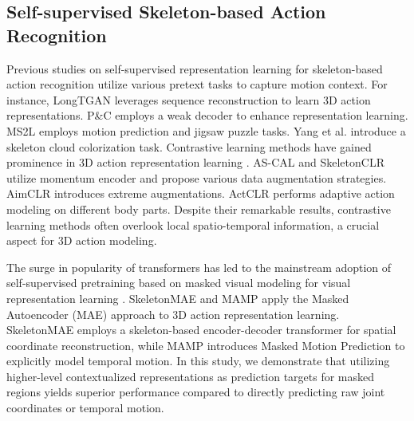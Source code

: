 \subsection{Self-supervised Skeleton-based Action Recognition}
Previous studies \cite{zheng2018unsupervised,su2020predict,lin2020ms2l} on
self-supervised representation learning for skeleton-based action recognition
utilize various pretext tasks to capture motion context.
For instance, LongTGAN \cite{zheng2018unsupervised} leverages sequence reconstruction
to learn 3D action representations. P\&C \cite{su2020predict} employs a weak
decoder to enhance representation learning. MS2L \cite{lin2020ms2l} employs
motion prediction and jigsaw puzzle tasks. Yang et al. \cite{yang2021skeleton}
introduce a skeleton cloud colorization task.
Contrastive learning methods have gained prominence in 3D action representation learning
\cite{he2020momentum,grill2020bootstrap,rao2021augmented,guo2022contrastive,moliner2022bootstrapped,lin2023actionlet}.
AS-CAL \cite{rao2021augmented} and SkeletonCLR \cite{li20213d} utilize momentum encoder
and propose various data augmentation strategies. AimCLR \cite{guo2022contrastive} introduces
extreme augmentations. ActCLR \cite{lin2023actionlet} performs adaptive action modeling
on different body parts. Despite their remarkable results, contrastive learning methods
often overlook local spatio-temporal information, a crucial aspect for 3D action modeling.

The surge in popularity of transformers has led to the mainstream adoption of self-supervised
pretraining based on masked visual modeling for visual representation learning \cite{he2022masked,bao2021beit}.
SkeletonMAE \cite{wu2023skeletonmae} and MAMP \cite{mao2023masked} apply the Masked Autoencoder (MAE)
approach to 3D action representation learning. SkeletonMAE employs a skeleton-based encoder-decoder
transformer for spatial coordinate reconstruction, while MAMP introduces Masked Motion Prediction
to explicitly model temporal motion. In this study, we demonstrate that utilizing higher-level
contextualized representations as prediction targets for masked regions yields superior performance
compared to directly predicting raw joint coordinates or temporal motion.

